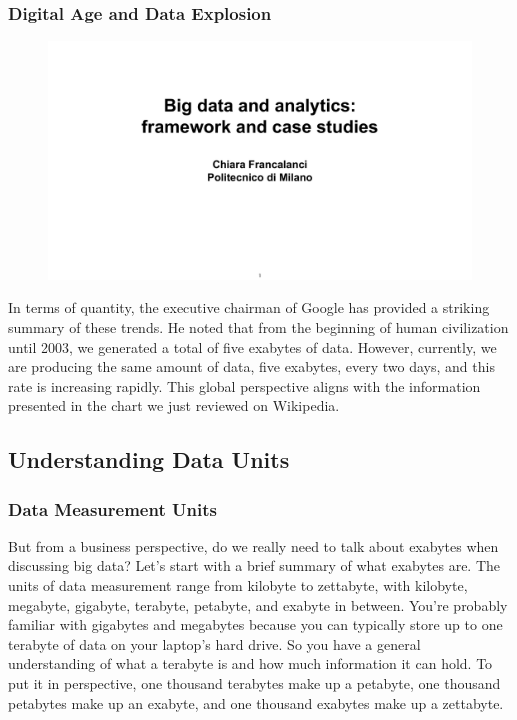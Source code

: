 \subsubsection{Digital Age and Data Explosion}

\begin{figure}[!h]
    \centering
    \includegraphics[page=27, trim = 1.5cm 2cm 1.5cm 3.5cm, clip, width=\textwidth]{images/06 - BIG_DATA.pdf}
\end{figure}

In terms of quantity, the executive chairman of Google has provided a
striking summary of these trends. He noted that from the beginning of
human civilization until 2003, we generated a total of five exabytes of
data. However, currently, we are producing the same amount of data, five
exabytes, every two days, and this rate is increasing rapidly. This
global perspective aligns with the information presented in the chart we
just reviewed on Wikipedia.

\subsection{Understanding Data Units}

\subsubsection{Data Measurement Units}

But from a business perspective, do we really need to talk about
exabytes when discussing big data? Let's start with a brief summary of
what exabytes are. The units of data measurement range from kilobyte to
zettabyte, with kilobyte, megabyte, gigabyte, terabyte, petabyte, and
exabyte in between. You're probably familiar with gigabytes and
megabytes because you can typically store up to one terabyte of data on
your laptop's hard drive. So you have a general understanding of what a
terabyte is and how much information it can hold. To put it in
perspective, one thousand terabytes make up a petabyte, one thousand
petabytes make up an exabyte, and one thousand exabytes make up a
zettabyte.


